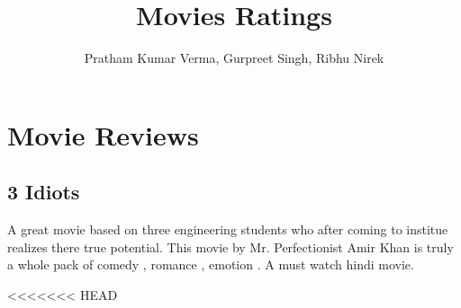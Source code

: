 \documentclass{article}
\title{Movies Ratings}
\author{Pratham Kumar Verma, Gurpreet Singh, Ribhu Nirek}
\date{}
\begin{document}
\maketitle

\section*{Movie Reviews}
\subsection*{3 Idiots}
    A great movie based on three engineering students who after coming to institue realizes there true potential.
This movie by Mr. Perfectionist Amir Khan is truly a whole pack of comedy , romance , emotion . A must watch hindi movie. 

<<<<<<< HEAD
\end{document}
